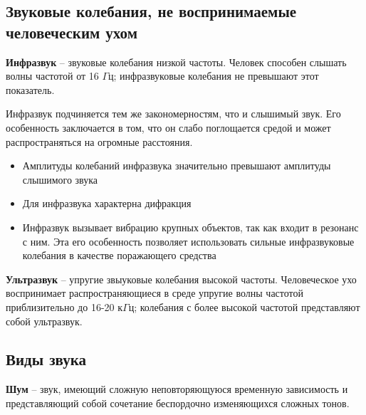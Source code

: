 \documentclass[referat,times]{SCWorks}
\begin{document}
\subsection{Звуковые колебания, не воспринимаемые человеческим ухом}
\par \textbf{Инфразвук} -- звуковые колебания низкой частоты. Человек способен слышать волны частотой от 16 $\Gamma$ц; инфразвуковые колебания не превышают этот показатель.
\par Инфразвук подчиняется тем же закономерностям, что и слышимый звук. Его особенность заключается в том, что он слабо поглощается средой и может распространяться на огромные расстояния.
\begin{itemize}
    \item Амплитуды колебаний инфразвука значительно превышают амплитуды слышимого звука
    \item Для инфразвука характерна дифракция
    \item Инфразвук вызывает вибрацию крупных объектов, так как входит в резонанс с ним. Эта его особенность позволяет использовать сильные инфразвуковые колебания в качестве поражающего средства
\end{itemize}
\par \textbf{Ультразвук} -- упругие звыуковые колебания высокой частоты. Человеческое ухо воспринимает распространяющиеся в среде упругие волны частотой приблизительно до 16-20 к$\Gamma$ц; колебания с более высокой частотой представляют собой ультразвук.\cite{ULTRAZVUK_1}
\subsection{Виды звука}
\textbf{Шум} -- звук, имеющий сложную неповторяющуюся временную зависимость и представляющий собой сочетание беспордочно изменяющихся сложных тонов.
\end{document}
